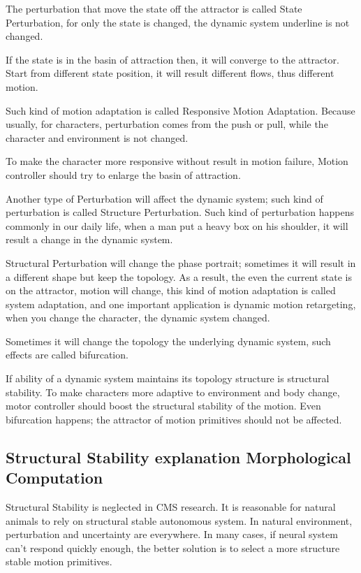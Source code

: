 \begin{itemize}

The perturbation that move the state off the attractor is called State Perturbation, for only the state is changed, the dynamic system underline is not changed.


If the state is in the basin of attraction then, it will converge to the attractor. 
Start from different state position, it will result different flows, thus different motion.

Such kind of motion adaptation is called Responsive Motion Adaptation.
Because usually, for characters, perturbation comes from the push or pull, while the character and environment is not changed.

To make the character more responsive without result in motion failure,
Motion controller should try to enlarge the basin of attraction.







Another type of Perturbation will affect the dynamic system; such kind of perturbation is called Structure Perturbation. Such kind of perturbation happens commonly in our daily life, when a man put a heavy box on his shoulder, it will result a change in the dynamic system.

Structural Perturbation will change the phase portrait; sometimes it will result in a different shape but keep the topology. As a result, the even the current state is on the attractor, motion will change, this kind of motion adaptation is called system adaptation, and one important application is dynamic motion retargeting, when you change the character, the dynamic system changed.

Sometimes it will change the topology the underlying dynamic system, such effects are called bifurcation.

If ability of a dynamic system maintains its topology structure is structural stability.
To make characters more adaptive to environment and body change, motor controller should boost the structural stability of the motion.
Even bifurcation happens; the attractor of motion primitives should not be affected.
\end{itemize}


\subsection{Structural Stability explanation Morphological Computation}
Structural Stability is neglected in CMS research.
It is reasonable for natural animals to rely on structural stable autonomous system. 
In natural environment, perturbation and uncertainty are everywhere. In many cases, if neural system
can’t respond quickly enough, the better solution is to select a more structure stable motion primitives.

